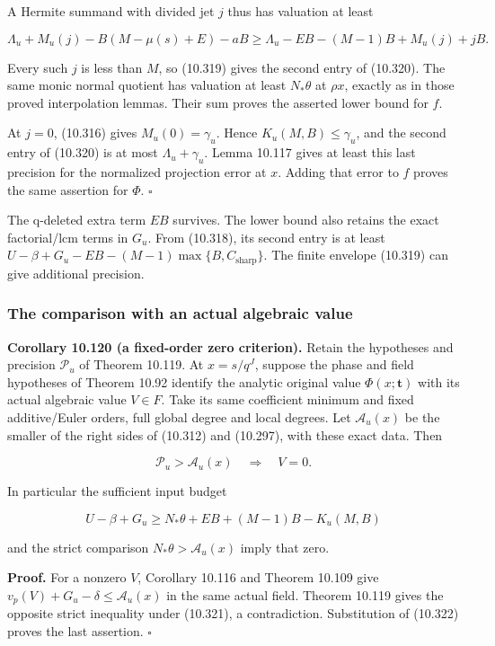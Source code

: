 \documentclass[
  11pt,
  a4paper,
]{article}
\begin{document}
A Hermite summand with divided jet \(j\) thus has valuation at least

\[
\Lambda_u+M_u(j)-B(M-\mu(s)+E)-aB
\ge\Lambda_u-EB-(M-1)B+M_u(j)+jB.
\]

Every such \(j\) is less than \(M\), so (10.319) gives the second entry
of (10.320). The same monic normal quotient has valuation at least
\(N_*\theta\) at \(\rho x\), exactly as in those proved interpolation
lemmas. Their sum proves the asserted lower bound for \(f\).

At \(j=0\), (10.316) gives \(M_u(0)=\gamma_u\). Hence
\(K_u(M,B)\le\gamma_u\), and the second entry of (10.320) is at most
\(\Lambda_u+\gamma_u\). Lemma 10.117 gives at least this last precision
for the normalized projection error at \(x\). Adding that error to \(f\)
proves the same assertion for \(\Phi\). \(\square\)

The q-deleted extra term \(EB\) survives. The lower bound also retains
the exact factorial/lcm terms in \(G_u\). From (10.318), its second
entry is at least \(U-\beta+G_u-EB-(M-1)\max\{B,C_{\mathrm{sharp}}\}\).
The finite envelope (10.319) can give additional precision.

\subsubsection{The comparison with an actual algebraic
value}\label{the-comparison-with-an-actual-algebraic-value}

\textbf{Corollary 10.120 (a fixed-order zero criterion).} Retain the
hypotheses and precision \(\mathcal P_u\) of Theorem 10.119. At
\(x=s/q^J\), suppose the phase and field hypotheses of Theorem 10.92
identify the analytic original value \(\Phi(x;\boldsymbol t)\) with its
actual algebraic value \(V\in F\). Take its same coefficient minimum and
fixed additive/Euler orders, full global degree and local degrees. Let
\(\mathcal A_u(x)\) be the smaller of the right sides of (10.312) and
(10.297), with these exact data. Then

\[
\mathcal P_u>\mathcal A_u(x)
\quad\Longrightarrow\quad V=0.
\tag{10.321}
\]

In particular the sufficient input budget

\[
U-\beta+G_u\ge N_*\theta+EB+(M-1)B-K_u(M,B)
\tag{10.322}
\]

and the strict comparison \(N_*\theta>\mathcal A_u(x)\) imply that zero.

\textbf{Proof.} For a nonzero \(V\), Corollary 10.116 and Theorem 10.109
give \(v_p(V)+G_u-\delta\le\mathcal A_u(x)\) in the same actual field.
Theorem 10.119 gives the opposite strict inequality under (10.321), a
contradiction. Substitution of (10.322) proves the last assertion.
\(\square\)
\end{document}

